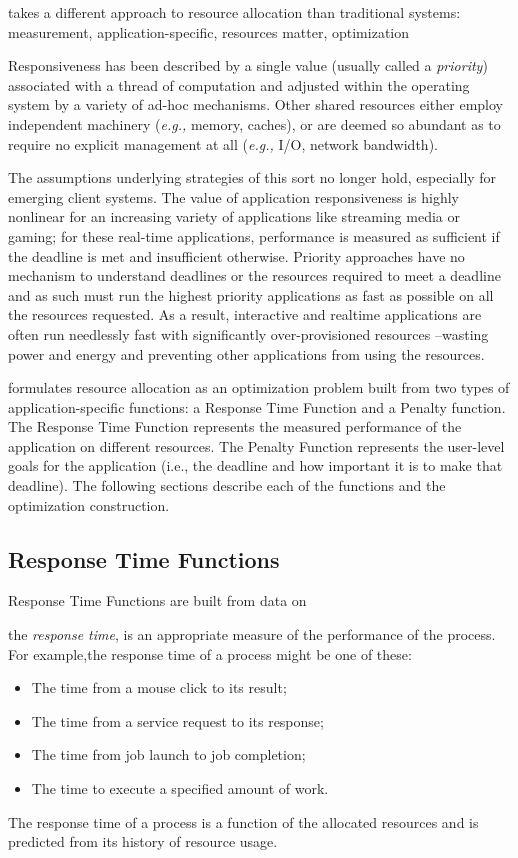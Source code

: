  
\pacora takes a different approach to resource allocation than traditional systems: measurement, application-specific, resources matter, optimization 

Responsiveness has been described by a single value (usually called a \emph{priority}) associated with a thread of computation and adjusted within the operating system by a variety of ad-hoc mechanisms.   Other shared resources either employ independent machinery (\emph{e.g.,} memory, caches), or are deemed so abundant as to require no explicit management at all (\emph{e.g.,} I/O, network bandwidth).

The assumptions underlying strategies of this sort no longer hold, especially for emerging client systems.  The value of application responsiveness is highly nonlinear for an increasing variety of applications like streaming media or gaming; for these real-time applications, performance is measured as sufficient if the deadline is met and insufficient otherwise.  Priority approaches have no mechanism to understand deadlines or the resources required to meet a deadline and as such must run the highest priority applications as fast as possible on all the resources requested.   As a result, interactive and realtime applications are often run needlessly fast with significantly over-provisioned resources --wasting power and energy and preventing other applications from using the resources.  


\pacora formulates resource allocation as an optimization problem built from two types of application-specific functions: a Response Time Function and a Penalty function. The Response Time Function represents the measured performance of the application on different resources.  The Penalty Function represents the user-level goals for the application (i.e., the deadline and how important it is to make that deadline). The following sections describe each of the functions and the optimization construction.

\subsection*{Response Time Functions}

Response Time Functions are built from data on 

 the \emph{response time},
    is an appropriate measure of the performance of the process.
    For example,the response time of a process might be one of these:
    \begin{itemize}[noitemsep]
    \item The time from a mouse click to its result;
    \item The time from a service request to its response;
    \item The time from job launch to job completion;
    \item The time to execute a specified amount of work.
    \end{itemize}
The response time of a process is a function of the allocated resources and is predicted from its history of resource usage.


